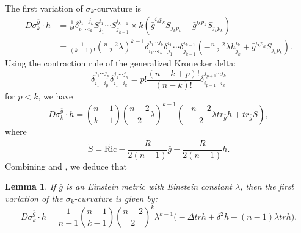 \documentclass[12pt]{amsart}
\newtheorem{lemma}{Lemma}[section]
\newcommand{\bg}{\bar{g}}
\numberwithin{equation}{section}
\begin{document}
The first variation of $\sigma_k$-curvature is
\begin{equation*}
\begin{split}
    D\sigma_k^{\bg}\cdot h&=\frac{1}{k!}\delta_{i_1\cdots i_k}^{j_1\cdots j_k}S_{j_1}^{i_1}\cdots S_{j_{k-1}}^{i_{k-1}}\times k(\dot{\bg}^{i_kp_k}S_{j_kp_k}+\bg^{i_kp_k}\dot{S}_{j_kp_k})\\
    &=\frac{1}{(k-1)!}\left(\frac{n-2}{2}\lambda\right)^{k-1}\delta_{i_1\cdots i_k}^{j_1\cdots j_k}\delta_{j_1}^{i_1}\cdots \delta_{j_{k-1}}^{i_{k-1}}\left(-\frac{n-2}{2}\lambda h_{j_k}^{i_k}+\bg^{i_kp_k}\dot{S}_{j_kp_k}\right).
\end{split}
\end{equation*}
Using the contraction rule of the generalized Kronecker delta:
\begin{equation*}
    \delta_{i_1\cdots i_p}^{j_1\cdots j_p}\delta_{i_1\cdots i_k}^{j_1\cdots j_k}=p!\frac{(n-k+p)!}{(n-k)!}\delta_{i_{p+1}\cdots i_k}^{j_{p+1}\cdots j_k}
\end{equation*}
for $p<k$, we have
\begin{equation*}
    D\sigma_k^{\bg}\cdot h=\binom{n-1}{k-1}\left(\frac{n-2}{2}\lambda\right)^{k-1}\left(-\frac{n-2}{2}\lambda tr_{\bg} h+tr_{\bg} \dot{S}\right),
\end{equation*}
where
\begin{equation*}
    \dot{S} = \dot{\mathrm{Ric}}-\frac{\dot{R}}{2(n-1)}\bg-\frac{R}{2(n-1)}h.
\end{equation*}
Combining  and , we deduce that
\begin{lemma}\label{Lemma: 1st_variation_of_sigma}
    If $\bg$ is an Einstein metric with Einstein constant $\lambda$, then the first variation of the $\sigma_k$-curvature is given by:
    \begin{equation*}
        D\sigma_k^{\bg}\cdot h=\frac{1}{n-1}\binom{n-1}{k-1}\left(\frac{n-2}{2}\right)^k\lambda^{k-1}\big(-\Delta trh+\delta^2h-(n-1)\lambda trh\big).
    \end{equation*}
\end{lemma}
\end{document}
